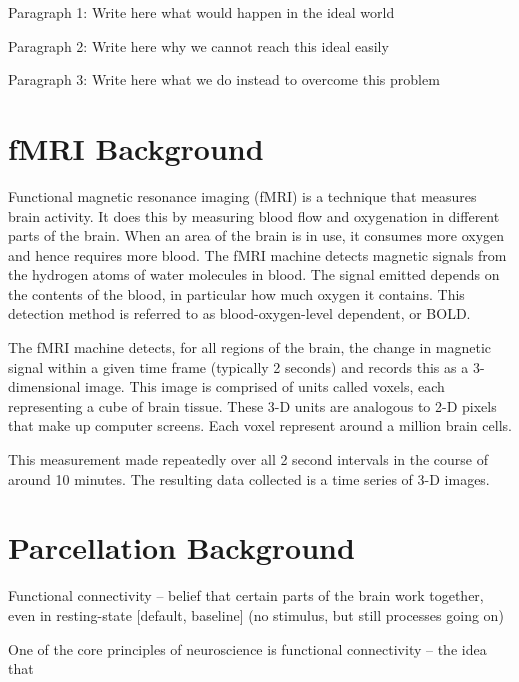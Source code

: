
Paragraph 1: Write here what would happen in the ideal world

Paragraph 2: Write here why we cannot reach this ideal easily

Paragraph 3: Write here what we do instead to overcome this problem

\section{fMRI Background}

Functional magnetic resonance imaging (fMRI) is a technique that
measures brain activity. It does this by measuring blood flow and
oxygenation in different parts of the brain. When an area of the brain
is in use, it consumes more oxygen and hence requires more blood.
The fMRI machine detects magnetic signals from the hydrogen atoms of
water molecules in blood. The signal emitted depends on the contents
of the blood, in particular how much oxygen it contains. This detection
method is referred to as blood-oxygen-level dependent, or BOLD.

The fMRI machine detects, for all regions of the brain, the change in
magnetic signal within a given time frame (typically 2 seconds) and
records this as a 3-dimensional image. This image is comprised of units
called voxels, each representing a cube of brain tissue. These 3-D units
are analogous to 2-D pixels that make up computer screens. Each voxel
represent around a million brain cells.

This measurement made repeatedly over all 2 second intervals in the
course of around 10 minutes. The resulting data collected is a time
series of 3-D images.

\section{Parcellation Background}

Functional connectivity -- belief that certain parts of the brain
  work together, even in resting-state [default, baseline] (no stimulus, but still processes going on)

One of the core principles of neuroscience is functional connectivity
-- the idea that 


